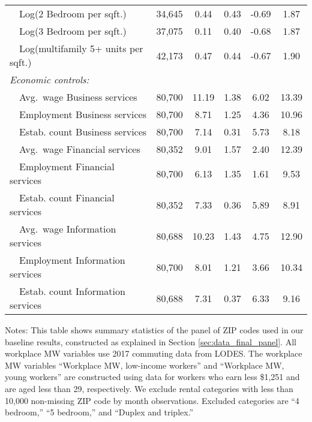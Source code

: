 \begin{table}[hbt!]
\begin{tabular}{@{}lccccc@{}}
        $\quad$Log(2 Bedroom per sqft.)               & 34,645  & 0.44  & 0.43  & -0.69  & 1.87  \\
        $\quad$Log(3 Bedroom per sqft.)               & 37,075  & 0.11  & 0.40  & -0.68  & 1.87  \\
        $\quad$Log(multifamily 5+ units per sqft.)    & 42,173  & 0.47  & 0.44  & -0.67  & 1.90  \\[.3em]
        \textit{Economic controls:}                   &       &       &       &       &       \\
        $\quad$Avg.\ wage Business services           & 80,700  & 11.19  & 1.38  & 6.02  & 13.39  \\
        $\quad$Employment Business services           & 80,700  & 8.71  & 1.25  & 4.36  & 10.96  \\
        $\quad$Estab. count Business services         & 80,700  & 7.14  & 0.31  & 5.73  & 8.18  \\
        $\quad$Avg.\ wage Financial services          & 80,352  & 9.01  & 1.57  & 2.40  & 12.39  \\
        $\quad$Employment Financial services          & 80,700  & 6.13  & 1.35  & 1.61  & 9.53  \\
        $\quad$Estab. count Financial services        & 80,352  & 7.33  & 0.36  & 5.89  & 8.91  \\
        $\quad$Avg.\ wage Information services        & 80,688  & 10.23  & 1.43  & 4.75  & 12.90  \\
        $\quad$Employment Information services        & 80,700  & 8.01  & 1.21  & 3.66  & 10.34  \\
        $\quad$Estab. count Information services      & 80,688  & 7.31  & 0.37  & 6.33  & 9.16  \\ \bottomrule
    \end{tabular}

    \begin{minipage}{.95\textwidth} \footnotesize
        \vspace{2mm}
        Notes: This table shows summary statistics of the panel of ZIP codes 
        used in our baseline results, constructed as explained in Section 
        \ref{sec:data_final_panel}.
        All workplace MW variables use 2017 commuting data from LODES.
        The workplace MW variables ``Workplace MW, low-income workers'' and 
        ``Workplace MW, young workers'' are constructed using data for 
        workers who earn less \$1,251 and are aged less than 29, respectively.
        We exclude rental categories with less than 10,000 non-missing ZIP code 
        by month observations.
        Excluded categories are ``4 bedroom,'' ``5 bedroom,'' and
        ``Duplex and triplex.''
    \end{minipage}
\end{table}
